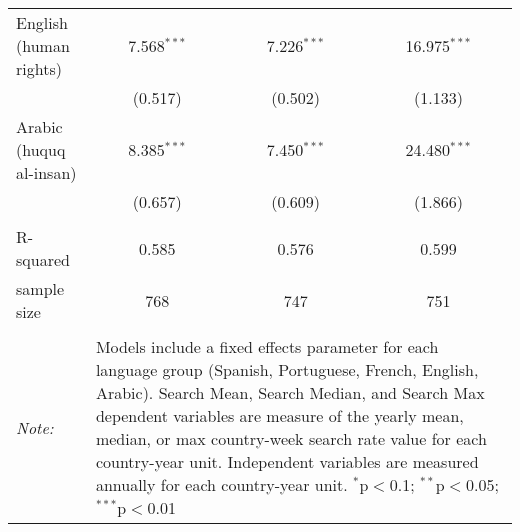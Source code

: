 \begin{table}[!htbp]
\begin{tabular}{@{\extracolsep{5pt}}lccc}
  English (human rights) & 7.568$^{***}$ & 7.226$^{***}$ & 16.975$^{***}$ \\ 
  & (0.517) & (0.502) & (1.133) \\ 
  Arabic (huquq al-insan) & 8.385$^{***}$ & 7.450$^{***}$ & 24.480$^{***}$ \\ 
  & (0.657) & (0.609) & (1.866) \\ 
 \hline \\[-1.8ex] 
R-squared  & 0.585 & 0.576 & 0.599 \\ 
sample size  & 768 & 747 & 751 \\ 
\hline 
\hline \\[-1.8ex] 
\textit{Note:}  & \multicolumn{3}{l}{\parbox[t]{8cm}{Models include a fixed effects parameter for each language group (Spanish, Portuguese, French, English, Arabic). Search Mean, Search Median, and Search Max dependent variables are measure of the yearly mean, median, or max country-week search rate value for each country-year unit. Independent variables are measured annually for each country-year unit. $^{*}$p$<$0.1; $^{**}$p$<$0.05; $^{***}$p$<$0.01}} \\ 
\end{tabular} 
\end{table} 
